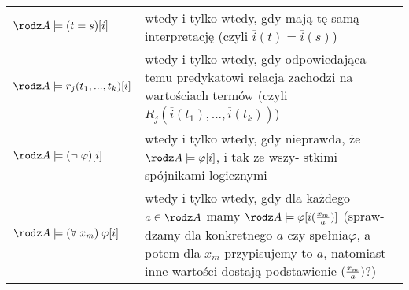 \begin{tabular} { m{3cm} m{15cm} }
    {\color{acc}$\rodz A\models (t=s)[i]$} & wtedy i tylko wtedy, gdy mają tę samą interpretację (czyli $\overline i(t)=\overline i(s)$)\\
    {\color{acc}$\rodz A\models r_j(t_1,...,t_k)[i]$} & wtedy i tylko wtedy, gdy odpowiedająca temu predykatowi relacja zachodzi na wartościach termów (czyli $R_j(\overline i (t_1), ..., \overline i (t_k))$)\\
    {\color{acc}$\rodz A \models (\neg\;\varphi)[i]$} & \makecell[tl]{wtedy i tylko wtedy, gdy nieprawda, że $\rodz A \models \varphi[i]$, i tak ze wszy-\\stkimi spójnikami logicznymi}\\
    {\color{acc}$\rodz A\models (\forall\;x_m)\;\varphi[i]$} & \makecell[tl]{wtedy i tylko wtedy, gdy dla każdego $a\in \rodz A$ mamy $\rodz A\models \varphi[i({x_m\over a})]$ (spraw-\\dzamy dla konkretnego $a$ czy spełnia$\varphi$, a potem dla $x_m$ przypisujemy to \\$a$, natomiast inne wartości dostają podstawienie $({x_m\over a})$?)}
\end{tabular}
